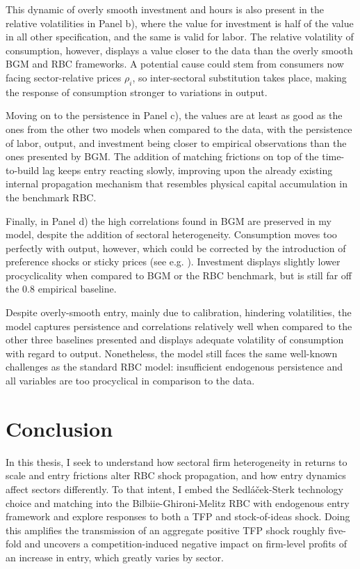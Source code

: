 \documentclass[a4paper,12pt]{article} %
\numberwithin{equation}{section} %
\numberwithin{figure}{section}
\numberwithin{table}{section}
\begin{document}
This dynamic of overly smooth investment and hours is also present in the relative volatilities in Panel b), where the value 
for investment is half of the value in all other specification, and the same is valid for labor. The relative volatility of
consumption, however, displays a value closer to the data than the overly smooth BGM and RBC frameworks. A potential cause could 
stem from consumers now facing sector-relative prices $\rho_i$, so inter-sectoral substitution takes place, making the 
response of consumption stronger to variations in output.

Moving on to the persistence in Panel c), the values are at least as good as the ones from the other two models 
when compared to the data, with the persistence of labor, output, and investment being closer to 
empirical observations than the ones presented by BGM. The addition of matching frictions on top of the 
time-to-build lag keeps entry reacting slowly, improving upon the already existing internal propagation mechanism 
that resembles physical capital accumulation in the benchmark RBC.

Finally, in Panel d) the high correlations found in BGM are preserved in my model, despite the addition of sectoral heterogeneity.
Consumption moves too perfectly with output, however, which could be corrected by the introduction of preference shocks or sticky
prices (see e.g. \cite{smets2007shocks}). Investment displays slightly lower procyclicality when compared to BGM or the RBC benchmark, but is still far off the $0.8$ 
empirical baseline. 

Despite overly-smooth entry, mainly due to calibration, hindering volatilities, the model captures persistence and 
correlations relatively well when compared to the other three baselines presented and displays adequate volatility of consumption
with regard to output. Nonetheless, the model still faces the same well-known challenges as the standard RBC model: 
insufficient endogenous persistence and all variables are too procyclical in  comparison to the data.


\section{Conclusion}
\label{sec:conclusion}

In this thesis, I seek to understand how sectoral firm heterogeneity in returns to scale and entry frictions alter RBC shock propagation, and how
entry dynamics affect sectors differently.
To that intent, I embed the Sedláček-Sterk technology choice and matching into the Bilbiie-Ghironi-Melitz RBC with endogenous entry framework and explore
responses to both a TFP and stock-of-ideas shock.
Doing this amplifies the transmission of an aggregate positive TFP shock roughly five-fold and uncovers a competition-induced negative 
impact on firm-level profits of an increase in entry, which greatly varies by sector. 
\end{document}
